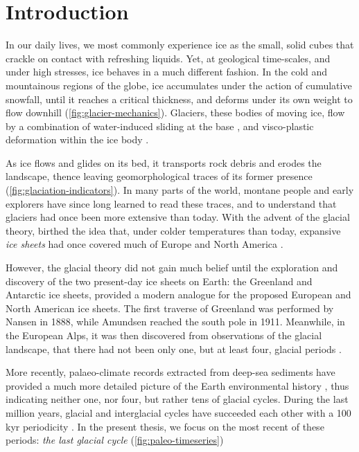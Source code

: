 \documentclass{article}
\begin{document}
\section{Introduction}

In our daily lives, we most commonly experience ice as the small, solid cubes
that crackle on contact with refreshing liquids. Yet, at geological
time-scales, and under high stresses, ice behaves in a much different fashion.
In the cold and mountainous regions of the globe, ice accumulates under the
action of cumulative snowfall, until it reaches a critical thickness, and
deforms under its own weight to flow downhill (\cref{fig:glacier-mechanics}).
Glaciers, these bodies of moving ice, flow by a combination of water-induced
sliding at the base \citep{Saussure.1796}, and visco-plastic deformation within
the ice body \citep{Forbes.1846b}.

As ice flows and glides on its bed, it transports rock debris and erodes the
landscape, thence leaving geomorphological traces of its former presence
(\cref{fig:glaciation-indicators}). In many parts of the world, montane people
and early explorers have since long learned to read these traces, and to
understand that glaciers had once been more extensive than today. With the
advent of the glacial theory, birthed the idea that, under colder temperatures
than today, expansive \emph{ice sheets} had once covered much of Europe and
North America \citep{Agassiz.1840}.

However, the glacial theory did not gain much belief until the exploration and
discovery of the two present-day ice sheets on Earth: the Greenland and
Antarctic ice sheets, provided a modern analogue for the proposed European and
North American ice sheets. The first traverse of Greenland was performed by
Nansen in 1888, while Amundsen reached the south pole in 1911. Meanwhile, in
the European Alps, it was then discovered from observations of the glacial
landscape, that there had not been only one, but at least four, glacial periods
\citep{Penck.Bruckner.1909}.

More recently, palaeo-climate records extracted from deep-sea sediments have
provided a much more detailed picture of the Earth environmental history
\citep[e.g.,][]{Emiliani.1955, Shackleton.Opdyke.1973}, thus indicating neither
one, nor four, but rather tens of glacial cycles. During the last million
years, glacial and interglacial cycles have succeeded each other with a
100\,kyr periodicity \citep{Hays.etal.1976}. In the present thesis, we focus on
the most recent of these periods: \emph{the last glacial cycle}
(\cref{fig:paleo-timeseries})
\end{document}
